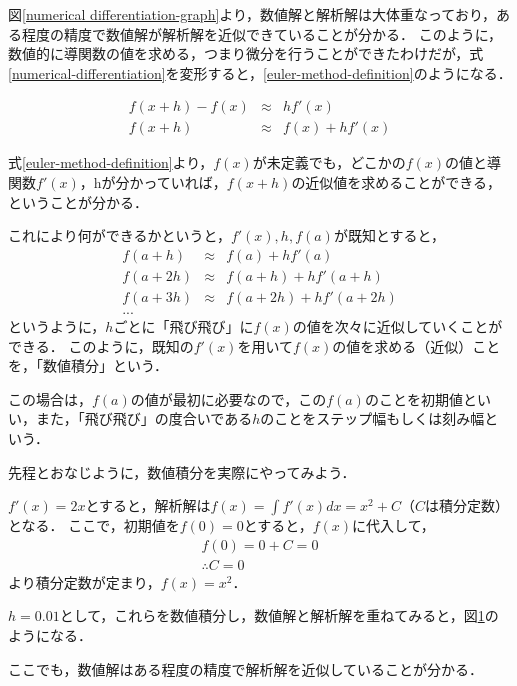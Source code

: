 図\ref{numerical differentiation-graph}より，数値解と解析解は大体重なっており，ある程度の精度で数値解が解析解を近似できていることが分かる．
このように，数値的に導関数の値を求める，つまり微分を行うことができたわけだが，式\ref{numerical-differentiation}を変形すると，\ref{euler-method-definition}のようになる．

\begin{eqnarray}
f(x+h)-f(x) &\approx& h f'(x) \\
f(x+h) &\approx& f(x) + h f'(x)
\label{euler-method-definition}
\end{eqnarray}

式\ref{euler-method-definition}より，$f(x)$が未定義でも，どこかの$f(x)$の値と導関数$f'(x)$，hが分かっていれば，$f(x+h)$の近似値を求めることができる，ということが分かる．

これにより何ができるかというと，$f'(x),h,f(a)$が既知とすると，
\begin{eqnarray}
f(a+h)  &\approx& f(a) + h f'(a) \\
f(a+2h) &\approx& f(a+h) + h f'(a+h) \\
f(a+3h) &\approx& f(a+2h) + h f'(a+2h) \\
...
\end{eqnarray}
というように，$h$ごとに「飛び飛び」に$f(x)$の値を次々に近似していくことができる．
このように，既知の$f'(x)$を用いて$f(x)$の値を求める（近似）ことを，「数値積分」という．

この場合は，$f(a)$の値が最初に必要なので，この$f(a)$のことを初期値といい，また，「飛び飛び」の度合いである$h$のことをステップ幅もしくは刻み幅という．


先程とおなじように，数値積分を実際にやってみよう．


$f'(x)=2x$とすると，解析解は$f(x)=\int f'(x) dx = x^2 + C$（$C$は積分定数）となる．
ここで，初期値を$f(0)=0$とすると，$f(x)$に代入して，
\begin{eqnarray}
f(0) = 0 + C = 0 \\
\therefore C = 0
\end{eqnarray}
より積分定数が定まり，$f(x) = x^2$．


$h=0.01$として，これらを数値積分し，数値解と解析解を重ねてみると，図\ref{euler-method-graph}のようになる．

\begin{figure}
\label{euler-method-graph}
\end{figure}

ここでも，数値解はある程度の精度で解析解を近似していることが分かる．

